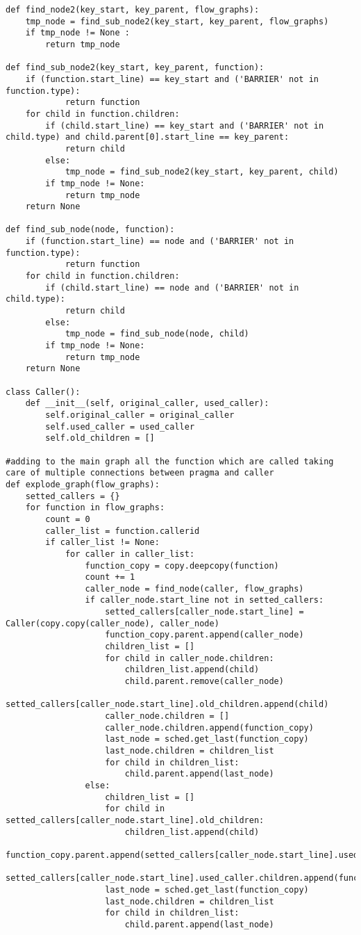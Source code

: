 \documentclass[a4paper,10pt,twoside]{book}
\begin{document}
\begin{lstlisting}[language=CCC, caption=pargraph.py]
def find_node2(key_start, key_parent, flow_graphs):
	tmp_node = find_sub_node2(key_start, key_parent, flow_graphs) 
	if tmp_node != None :
		return tmp_node

def find_sub_node2(key_start, key_parent, function):
	if (function.start_line) == key_start and ('BARRIER' not in function.type):
			return function
	for child in function.children:
		if (child.start_line) == key_start and ('BARRIER' not in child.type) and child.parent[0].start_line == key_parent:
			return child
		else:
			tmp_node = find_sub_node2(key_start, key_parent, child)
		if tmp_node != None:
			return tmp_node
	return None

def find_sub_node(node, function):
	if (function.start_line) == node and ('BARRIER' not in function.type):
			return function
	for child in function.children:
		if (child.start_line) == node and ('BARRIER' not in child.type):
			return child
		else:
			tmp_node = find_sub_node(node, child)
		if tmp_node != None:
			return tmp_node
	return None

class Caller():
	def __init__(self, original_caller, used_caller):
		self.original_caller = original_caller
		self.used_caller = used_caller
		self.old_children = []

#adding to the main graph all the function which are called taking care of multiple connections between pragma and caller
def explode_graph(flow_graphs):
	setted_callers = {}
	for function in flow_graphs:
		count = 0
		caller_list = function.callerid
		if caller_list != None:
			for caller in caller_list:
				function_copy = copy.deepcopy(function)
				count += 1
				caller_node = find_node(caller, flow_graphs)
				if caller_node.start_line not in setted_callers:
					setted_callers[caller_node.start_line] = Caller(copy.copy(caller_node), caller_node)
					function_copy.parent.append(caller_node)
					children_list = []
					for child in caller_node.children:
						children_list.append(child)
						child.parent.remove(caller_node)
						setted_callers[caller_node.start_line].old_children.append(child)
					caller_node.children = []
					caller_node.children.append(function_copy)
					last_node = sched.get_last(function_copy)
					last_node.children = children_list
					for child in children_list:
						child.parent.append(last_node)
				else:
					children_list = []
					for child in setted_callers[caller_node.start_line].old_children:
						children_list.append(child)
					function_copy.parent.append(setted_callers[caller_node.start_line].used_caller)
					setted_callers[caller_node.start_line].used_caller.children.append(function_copy)
					last_node = sched.get_last(function_copy)
					last_node.children = children_list
					for child in children_list:
						child.parent.append(last_node)



\end{lstlisting}
\end{document}
